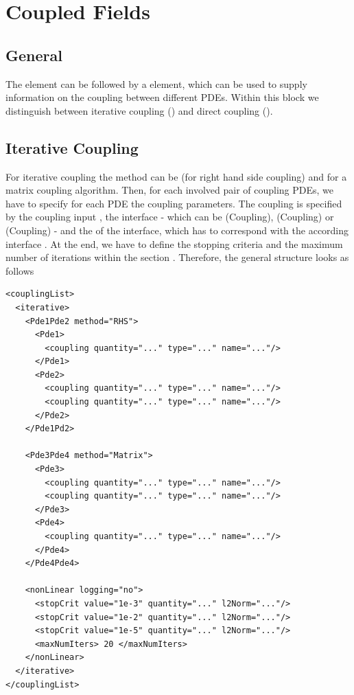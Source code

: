 %
%
\chapter{Coupled Fields}
%
%
\section{General}
The  element can be followed by a  element,
which can be used to supply information on the coupling between different
PDEs. Within this block we distinguish between iterative coupling
() and direct coupling ().
%
%
\section{Iterative Coupling}
 For iterative coupling
the method can be  (for right hand side coupling) and  for
a matrix coupling algorithm.
Then, for each involved pair of coupling PDEs, we have
to specify for each PDE the coupling parameters. 
The coupling is specified by the coupling input , the
interface  - which can be (Coupling),
(Coupling) or (Coupling) -  and the  of
the interface, which has to correspond with the according interface
. At the end, we have to define
the stopping criteria and the maximum number of iterations
within the section . Therefore, the general structure 
looks as follows


\begin{verbatim}
<couplingList>
  <iterative>
    <Pde1Pde2 method="RHS">
      <Pde1>
        <coupling quantity="..." type="..." name="..."/>
      </Pde1>
      <Pde2>
        <coupling quantity="..." type="..." name="..."/>
        <coupling quantity="..." type="..." name="..."/>
      </Pde2>
    </Pde1Pd2>

    <Pde3Pde4 method="Matrix">
      <Pde3>
        <coupling quantity="..." type="..." name="..."/>
        <coupling quantity="..." type="..." name="..."/>
      </Pde3>
      <Pde4>
        <coupling quantity="..." type="..." name="..."/>
      </Pde4>
    </Pde4Pde4>

    <nonLinear logging="no">
      <stopCrit value="1e-3" quantity="..." l2Norm="..."/>
      <stopCrit value="1e-2" quantity="..." l2Norm="..."/>
      <stopCrit value="1e-5" quantity="..." l2Norm="..."/>
      <maxNumIters> 20 </maxNumIters>
    </nonLinear>
  </iterative>
</couplingList>
\end{verbatim}

